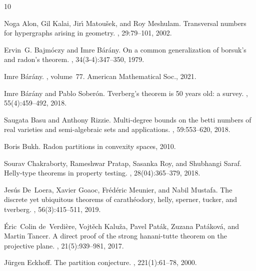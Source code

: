 \documentclass[a4paper,UKenglish,thm-restate]{article}
\begin{document}
\begin{thebibliography}{10}

Noga Alon, Gil Kalai, Jir{\'\i} Matou\v{s}ek, and Roy Meshulam.
\newblock Transversal numbers for hypergraphs arising in geometry.
, 29:79--101, 2002.

Ervin~G. Bajm{\'o}czy and Imre B{\'a}r{\'a}ny.
\newblock On a common generalization of borsuk's and radon's theorem.
, 34(3-4):347--350, 1979.

Imre B{\'a}r{\'a}ny.
, volume~77.
\newblock American Mathematical Soc., 2021.

Imre B{\'a}r{\'a}ny and Pablo Sober{\'o}n.
\newblock Tverberg’s theorem is 50 years old: a survey.
, 55(4):459--492,
  2018.

Saugata Basu and Anthony Rizzie.
\newblock Multi-degree bounds on the betti numbers of real varieties and
  semi-algebraic sets and applications.
, 59:553--620, 2018.

Boris Bukh.
\newblock Radon partitions in convexity spaces, 2010.

Sourav Chakraborty, Rameshwar Pratap, Sasanka Roy, and Shubhangi Saraf.
\newblock Helly-type theorems in property testing.
, 28(04):365--379, 2018.

Jes{\'u}s De~Loera, Xavier Goaoc, Fr{\'e}d{\'e}ric Meunier, and Nabil Mustafa.
\newblock The discrete yet ubiquitous theorems of carath{\'e}odory, helly,
  sperner, tucker, and tverberg.
, 56(3):415--511,
  2019.

{\'E}ric~Colin de~Verdi{\`e}re, Vojt{\v{e}}ch Kalu{\v{z}}a, Pavel Pat{\'a}k,
  Zuzana Pat{\'a}kov{\'a}, and Martin Tancer.
\newblock A direct proof of the strong hanani-tutte theorem on the projective
  plane.
, 21(5):939--981,
  2017.

Jürgen Eckhoff.
\newblock The partition conjecture.
, 221(1):61--78, 2000.


\end{thebibliography}
\end{document}
